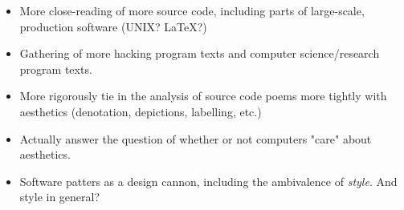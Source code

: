 \documentclass{article}
\begin{document}
\begin{itemize}
  \item More close-reading of more source code, including parts of large-scale, production software (UNIX? LaTeX?)
  \item Gathering of more hacking program texts and computer science/research program texts.
  \item More rigorously tie in the analysis of source code poems more tightly with aesthetics (denotation, depictions, labelling, etc.)
  \item Actually answer the question of whether or not computers "care" about aesthetics.
  \item Software patters as a design cannon, including the ambivalence of \emph{style}. And style in general?
\end{itemize}



\end{document}
